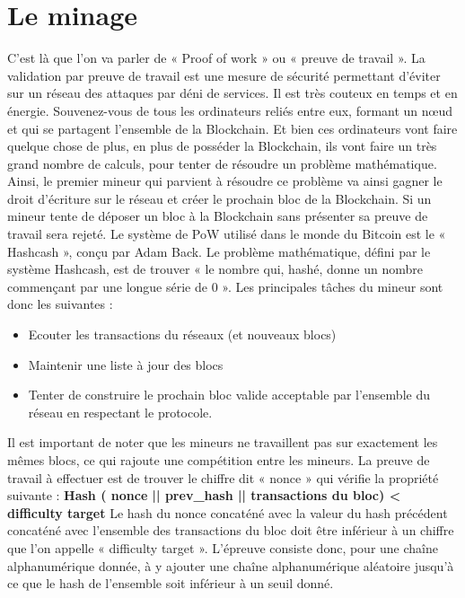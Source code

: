 \documentclass{bredele} %
\begin{document}
    \section*{Le minage}
    C’est là que l’on va parler de « Proof of work » ou « preuve de travail ».
    La validation par preuve de travail est une mesure de sécurité permettant d’éviter sur un réseau des attaques par déni de services. Il est très couteux en temps et en énergie.
    Souvenez-vous de tous les ordinateurs reliés entre eux, formant un nœud et qui se partagent l’ensemble de la Blockchain. Et bien ces ordinateurs vont faire quelque chose de plus, en plus de posséder la Blockchain, ils vont faire un très grand nombre de calculs, pour tenter de résoudre un problème mathématique. Ainsi, le premier mineur qui parvient à résoudre ce problème va ainsi gagner le droit d’écriture sur le réseau et créer le prochain bloc de la Blockchain. Si un mineur tente de déposer un bloc à la Blockchain sans présenter sa preuve de travail sera rejeté.
    \newline
    Le système de PoW utilisé dans le monde du Bitcoin est le « Hashcash », conçu par Adam Back.
    Le problème mathématique, défini par le système Hashcash, est de trouver « le nombre qui, hashé, donne un nombre commençant par une longue série de 0 ».
    \newline
    \newline
    Les principales tâches du mineur sont donc les suivantes :
    \begin{itemize}
        \item Ecouter les transactions du réseaux (et nouveaux blocs)
        \item Maintenir une liste à jour des blocs
        \item Tenter de construire le prochain bloc valide acceptable par l’ensemble du réseau en respectant le protocole.
    \end{itemize}
    Il est important de noter que les mineurs ne travaillent pas sur exactement les mêmes blocs, ce qui rajoute une compétition entre les mineurs.
    La preuve de travail à effectuer est de trouver le chiffre dit « nonce » qui vérifie la propriété suivante :
    \newline
    \textbf{Hash ( nonce || prev\_hash || transactions du bloc) < difficulty target}
    Le hash du nonce concaténé avec la valeur du hash précédent concaténé avec l’ensemble des transactions du bloc doit être inférieur à un chiffre que l’on appelle « difficulty target ».
    L’épreuve consiste donc, pour une chaîne alphanumérique donnée, à y ajouter une chaîne alphanumérique aléatoire jusqu’à ce que le hash de l’ensemble soit inférieur à un seuil donné.
\end{document}
